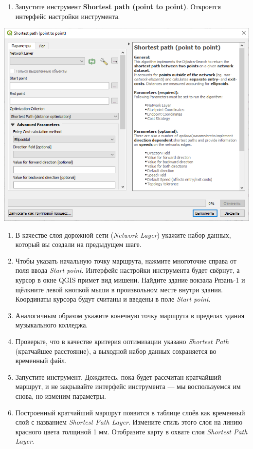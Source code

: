 \documentclass[
  12pt,
]{book}
\providecommand{\tightlist}{%
  \setlength{\itemsep}{0pt}\setlength{\parskip}{0pt}}
\begin{document}
\begin{enumerate}
\def\labelenumi{\arabic{enumi}.}
\setcounter{enumi}{3}
\tightlist
\item
  Запустите инструмент \textbf{Shortest path (point to point)}. Откроется интерфейс настройки инструмента.
\end{enumerate}

\includegraphics{images/Ex11_RoadNetwork/qneat3_interface.png}

\begin{enumerate}
\def\labelenumi{\arabic{enumi}.}
\setcounter{enumi}{4}
\item
  В качестве слоя дорожной сети (\emph{Network Layer}) укажите набор данных, который вы создали на предыдущем шаге.
\item
  Чтобы указать начальную точку маршрута, нажмите многоточие справа от поля ввода \emph{Start point}. Интерфейс настройки инструмента будет свёрнут, а курсор в окне QGIS примет вид мишени. Найдите здание вокзала Рязань-1 и щёлкните левой кнопкой мыши в произвольном месте внутри здания. Координаты курсора будут считаны и введены в поле \emph{Start point}.
\item
  Аналогичным образом укажите конечную точку маршрута в пределах здания музыкального колледжа.
\item
  Проверьте, что в качестве критерия оптимизации указано \emph{Shortest Path} (кратчайшее расстояние), а выходной набор данных сохраняется во временный файл.
\item
  Запустите инструмент. Дождитесь, пока будет рассчитан кратчайший маршрут, и не закрывайте интерфейс инструмента --- мы воспользуемся им снова, но изменим параметры.
\item
  Построенный кратчайший маршрут появится в таблице слоёв как временный слой с названием \emph{Shortest Path Layer}. Измените стиль этого слоя на линию красного цвета толщиной 1 мм. Отобразите карту в охвате слоя \emph{Shortest Path Layer}.
\end{enumerate}
\end{document}
